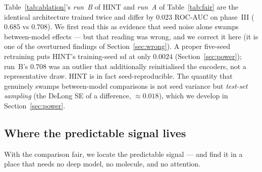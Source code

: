 \documentclass[a4paper,fleqn]{cas-sc}
\begin{document}
Table~\ref{tab:ablation}'s \emph{run~B} of HINT and \emph{run~A} of Table~\ref{tab:fair} are the
identical architecture trained twice and differ by $0.023$ ROC-AUC on phase~III ($0.685$ vs
$0.708$). We first read this as evidence that seed noise alone swamps between-model effects --- but
that reading was wrong, and we correct it here (it is one of the overturned findings of
Section~\ref{sec:wrong}). A proper five-seed retraining puts HINT's training-seed sd at only
$0.0024$ (Section~\ref{sec:power}); run~B's $0.708$ was an outlier that additionally reinitialised
the encoders, not a representative draw. HINT is in fact seed-reproducible. The quantity that
genuinely swamps between-model comparisons is not seed variance but \emph{test-set sampling} (the
DeLong SE of a difference, $\approx0.018$), which we develop in Section~\ref{sec:power}.
\subsection{Where the predictable signal lives}
With the comparison fair, we locate the predictable signal --- and find it in a place that needs no deep model, no molecule, and no attention.
\end{document}
